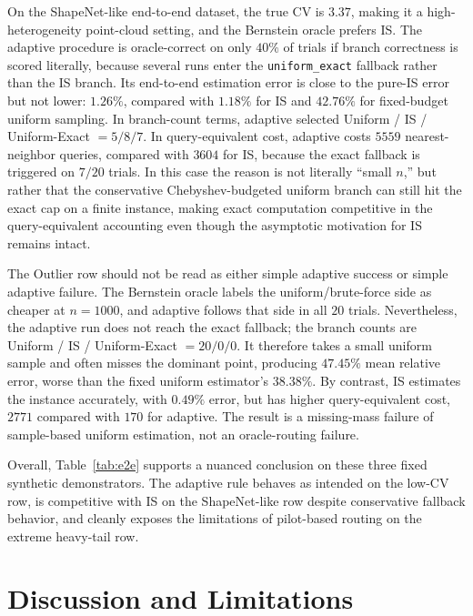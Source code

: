 \documentclass[conference]{IEEEtran}
\begin{document}
On the ShapeNet-like end-to-end dataset, the true CV is $3.37$, making
it a high-heterogeneity point-cloud setting, and the Bernstein oracle
prefers IS. The adaptive procedure is oracle-correct on only
$40\%$ of trials if branch correctness is scored literally, because
several runs enter the \texttt{uniform\_exact} fallback rather than the
IS branch. Its end-to-end estimation error is close to the pure-IS
error but not lower: $1.26\%$, compared with $1.18\%$ for IS and
$42.76\%$ for fixed-budget uniform sampling. In branch-count terms,
adaptive selected Uniform / IS / Uniform-Exact
$= 5 / 8 / 7$. In query-equivalent cost, adaptive costs $5559$
nearest-neighbor queries, compared with $3604$ for IS, because the
exact fallback is triggered on $7/20$ trials. In this case the reason
is not literally ``small $n$,'' but rather that the conservative
Chebyshev-budgeted uniform branch can still hit the exact cap on a
finite instance, making exact computation competitive in the
query-equivalent accounting even though the asymptotic motivation for
IS remains intact.

The Outlier row should not be read as either simple adaptive success or
simple adaptive failure. The Bernstein oracle labels the
uniform/brute-force side as cheaper at $n=1000$, and adaptive follows
that side in all $20$ trials. Nevertheless, the adaptive run does not
reach the exact fallback; the branch counts are Uniform / IS /
Uniform-Exact $= 20 / 0 / 0$. It therefore takes a small uniform sample
and often misses the dominant point, producing $47.45\%$ mean relative
error, worse than the fixed uniform estimator's $38.38\%$. By contrast,
IS estimates the instance accurately, with $0.49\%$ error, but has
higher query-equivalent cost, $2771$ compared with $170$ for adaptive.
The result is a missing-mass failure of sample-based uniform estimation,
not an oracle-routing failure.

Overall, Table~\ref{tab:e2e} supports a nuanced conclusion on these
three fixed synthetic demonstrators. The adaptive rule behaves as
intended on the low-CV row, is competitive with IS on the
ShapeNet-like row despite conservative fallback behavior, and cleanly
exposes the limitations of pilot-based routing on the extreme
heavy-tail row.



\section{Discussion and Limitations}
\label{sec:discussion}
\end{document}
